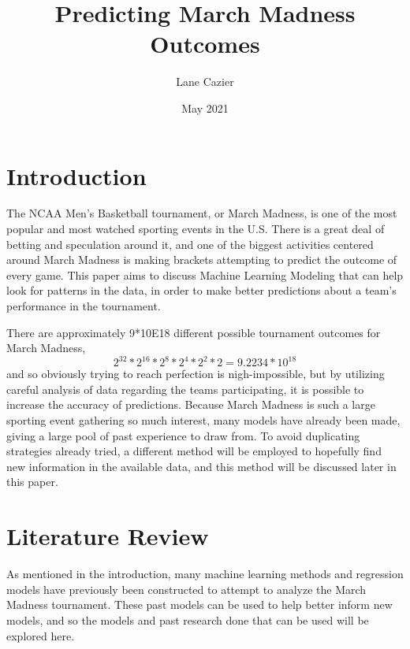 \documentclass{article}
\title{Predicting March Madness Outcomes}
\author{Lane Cazier}
\date{May 2021}
\begin{document}
\maketitle

\section{Introduction}
The NCAA Men's Basketball tournament, or March Madness, is one of the most popular and most watched sporting events in the U.S. There is a great deal of betting and speculation around it, and one of the biggest activities centered around March Madness is making brackets attempting to predict the outcome of every game. This paper aims to discuss Machine Learning Modeling that can help look for patterns in the data, in order to make better predictions about a team's performance in the tournament. 

There are approximately 9*10E18 different possible tournament outcomes for March Madness,\[2^{32}*2^{16}*2^8*2^4*2^2*2 = 9.2234 * 10^{18}\] and so obviously trying to reach perfection is nigh-impossible, but by utilizing careful analysis of data regarding the teams participating, it is possible to increase the accuracy of predictions. Because March Madness is such a large sporting event gathering so much interest, many models have already been made, giving a large pool of past experience to draw from. To avoid duplicating strategies already tried, a different method will be employed to hopefully find new information in the available data, and this method will be discussed later in this paper. 

\section{Literature Review}
As mentioned in the introduction, many machine learning methods and regression models have previously been constructed to attempt to analyze the March Madness tournament. These past models can be used to help better inform new models, and so the models and past research done that can be used will be explored here. 
\end{document}
